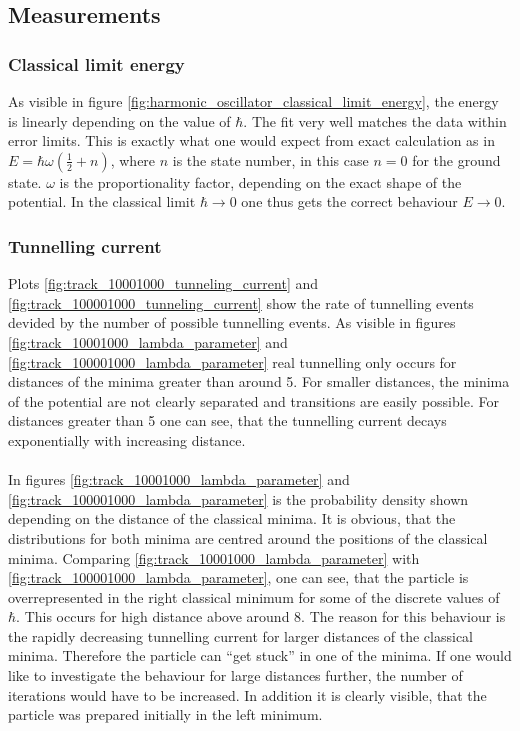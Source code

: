 \documentclass{scrartcl}
\begin{document}
	\subsection{Measurements}
	\subsubsection{Classical limit energy}
		As visible in figure \ref{fig:harmonic_oscillator_classical_limit_energy}, the energy is linearly depending on the value of $\hbar$.
		The fit very well matches the data within error limits.
		This is exactly what one would expect from exact calculation as in $E = \hbar \omega \left(\frac 12 + n\right)$, where $n$ is the state number, in this case $n = 0$ for the ground state.
		$\omega$ is the proportionality factor, depending on the exact shape of the potential.
		In the classical limit $\hbar \rightarrow 0$ one thus gets the correct behaviour $E \rightarrow 0$.

	\subsubsection{Tunnelling current}
		Plots \ref{fig:track_10001000_tunneling_current} and \ref{fig:track_100001000_tunneling_current} show the rate of tunnelling events devided by the number of possible tunnelling events. %
		As visible in figures \ref{fig:track_10001000_lambda_parameter} and \ref{fig:track_100001000_lambda_parameter} real tunnelling only occurs for distances of the minima greater than around 5.
		For smaller distances, the minima of the potential are not clearly separated and transitions are easily possible. %
		For distances greater than 5 one can see, that the tunnelling current decays exponentially with increasing distance.
		\\
		\\
		In figures \ref{fig:track_10001000_lambda_parameter} and \ref{fig:track_100001000_lambda_parameter} is the probability density shown depending on the distance of the classical minima.
		It is obvious, that the distributions for both minima are centred around the positions of the classical minima.
		Comparing \ref{fig:track_10001000_lambda_parameter} with \ref{fig:track_100001000_lambda_parameter}, one can see, that the particle is overrepresented in the right classical minimum for some of the discrete values of $\hbar$.
		This occurs for high distance above around 8.
		The reason for this behaviour is the rapidly decreasing tunnelling current for larger distances of the classical minima.
		Therefore the particle can \enquote{get stuck} in one of the minima.
		If one would like to investigate the behaviour for large distances further, the number of iterations would have to be increased.
		In addition it is clearly visible, that the particle was prepared initially in the left minimum.
\end{document}
